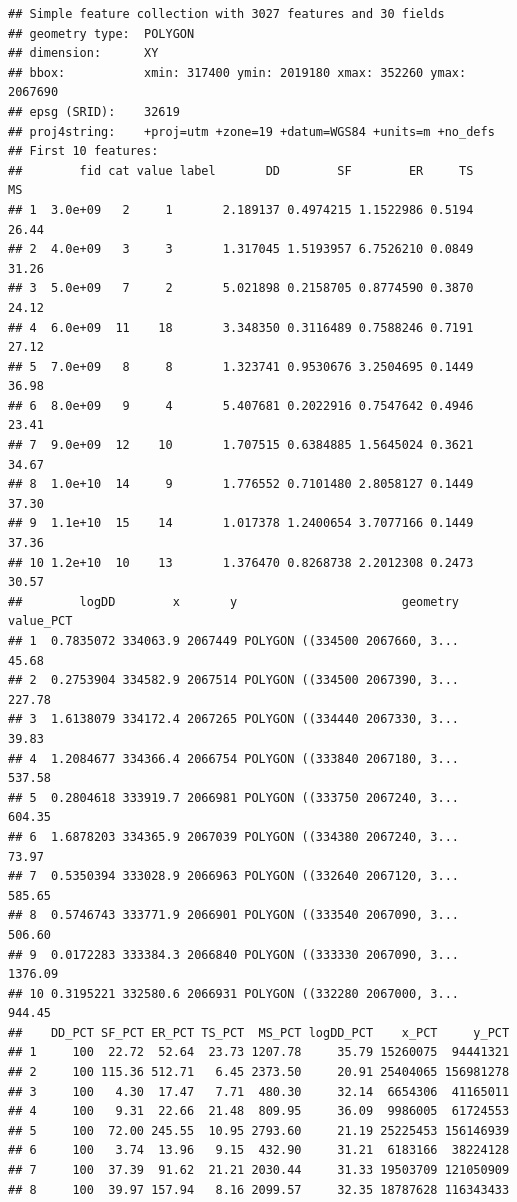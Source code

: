 \documentclass[11pt,]{article}
\begin{document}
\begin{verbatim}
## Simple feature collection with 3027 features and 30 fields
## geometry type:  POLYGON
## dimension:      XY
## bbox:           xmin: 317400 ymin: 2019180 xmax: 352260 ymax: 2067690
## epsg (SRID):    32619
## proj4string:    +proj=utm +zone=19 +datum=WGS84 +units=m +no_defs
## First 10 features:
##        fid cat value label       DD        SF        ER     TS    MS
## 1  3.0e+09   2     1       2.189137 0.4974215 1.1522986 0.5194 26.44
## 2  4.0e+09   3     3       1.317045 1.5193957 6.7526210 0.0849 31.26
## 3  5.0e+09   7     2       5.021898 0.2158705 0.8774590 0.3870 24.12
## 4  6.0e+09  11    18       3.348350 0.3116489 0.7588246 0.7191 27.12
## 5  7.0e+09   8     8       1.323741 0.9530676 3.2504695 0.1449 36.98
## 6  8.0e+09   9     4       5.407681 0.2022916 0.7547642 0.4946 23.41
## 7  9.0e+09  12    10       1.707515 0.6384885 1.5645024 0.3621 34.67
## 8  1.0e+10  14     9       1.776552 0.7101480 2.8058127 0.1449 37.30
## 9  1.1e+10  15    14       1.017378 1.2400654 3.7077166 0.1449 37.36
## 10 1.2e+10  10    13       1.376470 0.8268738 2.2012308 0.2473 30.57
##        logDD        x       y                       geometry value_PCT
## 1  0.7835072 334063.9 2067449 POLYGON ((334500 2067660, 3...     45.68
## 2  0.2753904 334582.9 2067514 POLYGON ((334500 2067390, 3...    227.78
## 3  1.6138079 334172.4 2067265 POLYGON ((334440 2067330, 3...     39.83
## 4  1.2084677 334366.4 2066754 POLYGON ((333840 2067180, 3...    537.58
## 5  0.2804618 333919.7 2066981 POLYGON ((333750 2067240, 3...    604.35
## 6  1.6878203 334365.9 2067039 POLYGON ((334380 2067240, 3...     73.97
## 7  0.5350394 333028.9 2066963 POLYGON ((332640 2067120, 3...    585.65
## 8  0.5746743 333771.9 2066901 POLYGON ((333540 2067090, 3...    506.60
## 9  0.0172283 333384.3 2066840 POLYGON ((333330 2067090, 3...   1376.09
## 10 0.3195221 332580.6 2066931 POLYGON ((332280 2067000, 3...    944.45
##    DD_PCT SF_PCT ER_PCT TS_PCT  MS_PCT logDD_PCT    x_PCT     y_PCT
## 1     100  22.72  52.64  23.73 1207.78     35.79 15260075  94441321
## 2     100 115.36 512.71   6.45 2373.50     20.91 25404065 156981278
## 3     100   4.30  17.47   7.71  480.30     32.14  6654306  41165011
## 4     100   9.31  22.66  21.48  809.95     36.09  9986005  61724553
## 5     100  72.00 245.55  10.95 2793.60     21.19 25225453 156146939
## 6     100   3.74  13.96   9.15  432.90     31.21  6183166  38224128
## 7     100  37.39  91.62  21.21 2030.44     31.33 19503709 121050909
## 8     100  39.97 157.94   8.16 2099.57     32.35 18787628 116343433

\end{verbatim}
\end{document}
